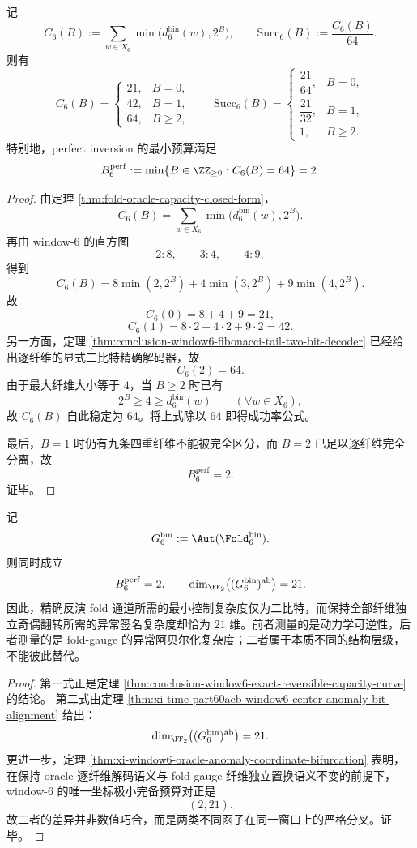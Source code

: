 \begin{theorem}\label{thm:conclusion-window6-exact-reversible-capacity-curve}
记
\[
C_6(B):=\sum_{w\in X_6}\min\bigl(d_6^{\mathrm{bin}}(w),2^B\bigr),
\qquad
\mathrm{Succ}_6(B):=\frac{C_6(B)}{64}.
\]
则有
\[
C_6(B)=
\begin{cases}
21,& B=0,\\
42,& B=1,\\
64,& B\ge 2,
\end{cases}
\qquad
\mathrm{Succ}_6(B)=
\begin{cases}
\dfrac{21}{64},& B=0,\\[2mm]
\dfrac{21}{32},& B=1,\\[2mm]
1,& B\ge 2.
\end{cases}
\]
特别地，perfect inversion 的最小预算满足
\[
B_6^{\mathrm{perf}}
:=
\min\{B\in\ZZ_{\ge 0}: C_6(B)=64\}
=2.
\]
\end{theorem}
\begin{proof}
由定理 \ref{thm:fold-oracle-capacity-closed-form}，
\[
C_6(B)=\sum_{w\in X_6}\min\bigl(d_6^{\mathrm{bin}}(w),2^B\bigr).
\]
再由 window-\(6\) 的直方图
\[
2:8,\qquad 3:4,\qquad 4:9,
\]
得到
\[
C_6(B)=8\min(2,2^B)+4\min(3,2^B)+9\min(4,2^B).
\]
故
\[
C_6(0)=8+4+9=21,
\]
\[
C_6(1)=8\cdot 2+4\cdot 2+9\cdot 2=42.
\]
另一方面，定理 \ref{thm:conclusion-window6-fibonacci-tail-two-bit-decoder} 已经给出逐纤维的显式二比特精确解码器，故
\[
C_6(2)=64.
\]
由于最大纤维大小等于 \(4\)，当 \(B\ge 2\) 时已有
\[
2^B\ge 4\ge d_6^{\mathrm{bin}}(w)
\qquad (\forall w\in X_6),
\]
故 \(C_6(B)\) 自此稳定为 \(64\)。将上式除以 \(64\) 即得成功率公式。

最后，\(B=1\) 时仍有九条四重纤维不能被完全区分，而 \(B=2\) 已足以逐纤维完全分离，故
\[
B_6^{\mathrm{perf}}=2.
\]
证毕。
\end{proof}

\begin{theorem}[可逆复杂度与异常复杂度的严格分离]\label{thm:conclusion-window6-inversion-anomaly-strict-separation}
记
\[
G_6^{\mathrm{bin}}:=\Aut(\Fold_6^{\mathrm{bin}}).
\]
则同时成立
\[
B_6^{\mathrm{perf}}=2,
\qquad
\dim_{\FF_2}\bigl((G_6^{\mathrm{bin}})^{\mathrm{ab}}\bigr)=21.
\]
因此，精确反演 fold 通道所需的最小控制复杂度仅为二比特，而保持全部纤维独立奇偶翻转所需的异常签名复杂度却恰为 \(21\) 维。前者测量的是动力学可逆性，后者测量的是 fold-gauge 的异常阿贝尔化复杂度；二者属于本质不同的结构层级，不能彼此替代。
\end{theorem}
\begin{proof}
第一式正是定理 \ref{thm:conclusion-window6-exact-reversible-capacity-curve} 的结论。
第二式由定理 \ref{thm:xi-time-part60acb-window6-center-anomaly-bit-alignment} 给出：
\[
\dim_{\FF_2}\bigl((G_6^{\mathrm{bin}})^{\mathrm{ab}}\bigr)=21.
\]
更进一步，定理 \ref{thm:xi-window6-oracle-anomaly-coordinate-bifurcation} 表明，在保持 oracle 逐纤维解码语义与 fold-gauge 纤维独立置换语义不变的前提下，window-\(6\) 的唯一坐标极小完备预算对正是
\[
(2,21).
\]
故二者的差异并非数值巧合，而是两类不同函子在同一窗口上的严格分叉。证毕。
\end{proof}

